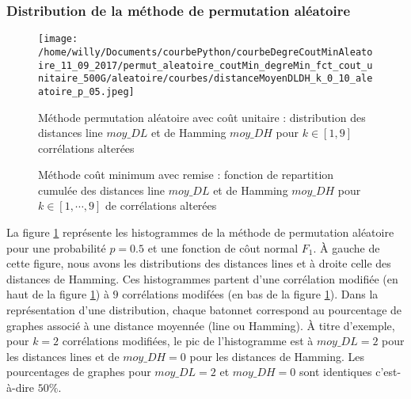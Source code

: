 \subsubsection{Distribution de la m\'ethode de permutation al\'eatoire}
\begin{centering} 
\begin{figure}[htb!] 
\texttt{[image: /home/willy/Documents/courbePython/courbeDegreCoutMinAleatoire\_11\_09\_2017/permut\_aleatoire\_coutMin\_degreMin\_fct\_cout\_unitaire\_500G/aleatoire/courbes/distanceMoyenDLDH\_k\_0\_10\_aleatoire\_p\_05.jpeg]}
\caption{ M\'ethode permutation al\'eatoire avec co\^ut unitaire : distribution des distances line $moy\_DL$ et de Hamming $moy\_DH$ pour $k \in [1,  9]$ corr\'elations alter\'ees}
\label{distLineHammingPermutAleatoireK09p05} 
\end{figure}
\end{centering} 
\begin{centering} 
\begin{figure}[htb!] 
\caption{ M\'ethode co\^ut minimum avec remise : fonction de repartition cumul\'ee des distances line $moy\_DL$ et de Hamming $moy\_DH$ pour $k \in [1, \cdots, 9]$ de corr\'elations alter\'ees}
\label{fctRepartitionCumuleDistLineHammingPermutAleatoireK09p05} 
\end{figure}
\end{centering} 
La figure \ref{distLineHammingPermutAleatoireK09p05} repr\'esente les histogrammes de la m\'ethode de permutation al\'eatoire pour une probabilit\'e $p=0.5$ et une fonction de c\^out normal $F_1$. \`A gauche de cette figure, nous avons les distributions des distances lines et \`a droite celle des distances de Hamming. Ces histogrammes partent d'une corr\'elation modifi\'ee (en haut de la figure \ref{distLineHammingPermutAleatoireK09p05}) \`a $9$ corr\'elations  modif\'ees (en bas de la figure \ref{distLineHammingPermutAleatoireK09p05}). 
\newline
Dans la repr\'esentation d'une distribution, chaque batonnet correspond au pourcentage de graphes associ\'e \`a une distance moyenn\'ee (line ou Hamming).
\`A titre d'exemple, pour $k=2$ corr\'elations modifi\'ees, le pic de l'histogramme est \`a $moy\_DL = 2$ pour les distances lines et de $moy\_DH=0$ pour les distances de Hamming. Les pourcentages de graphes pour  $moy\_DL = 2$ et $moy\_DH=0$ sont identiques c'est-\`a-dire $50\%$.
